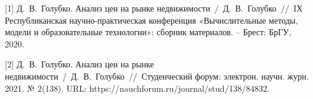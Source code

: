 
[1] Д.~В.~Голубко. Анализ цен на рынке недвижимости~/~Д.~В.~Голубко~//~IХ Республиканская научно-практическая
конференция «Вычислительные методы, модели и образовательные технологии»: сборник материалов. – Брест: БрГУ, 2020.

[2] Д.~В.~Голубко. Анализ цен на рынке недвижимости~/~Д.~В.~Голубко~//~Студенческий форум: электрон. научн. журн. 2021. № 2(138).\linebreak
URL: https://nauchforum.ru/journal/stud/138/84832.
\newpage


